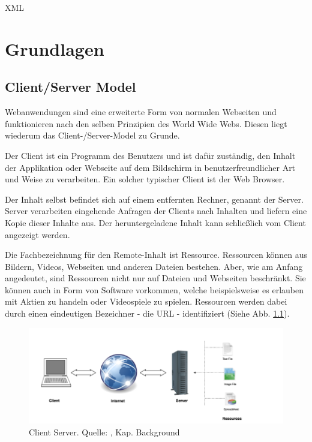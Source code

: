 XML\chapter{Grundlagen}

\section{Client/Server Model}
\label{sec:client_server}

Webanwendungen sind eine erweiterte Form von normalen Webseiten und funktionieren nach den selben Prinzipien des World Wide Webs. Diesen liegt wiederum das Client-/Server-Model zu Grunde.

Der Client ist ein Programm des Benutzers und ist dafür zuständig, den Inhalt der Applikation oder Webseite auf dem Bildschirm in benutzerfreundlicher Art und Weise zu verarbeiten. Ein solcher typischer Client ist der Web Browser.

Der Inhalt selbst befindet sich auf einem entfernten Rechner, genannt der Server. Server verarbeiten eingehende Anfragen der Clients nach Inhalten und liefern eine Kopie dieser Inhalte aus. Der heruntergeladene Inhalt kann schließlich vom Client angezeigt werden.

Die Fachbezeichnung für den Remote-Inhalt ist Ressource. Ressourcen können aus Bildern, Videos, Webseiten und anderen Dateien bestehen. Aber, wie am Anfang angedeutet, sind Ressourcen nicht nur auf Dateien und Webseiten beschränkt. Sie können auch in Form von Software vorkommen, welche beispielsweise es erlauben mit Aktien zu handeln oder Videospiele zu spielen. Ressourcen werden dabei durch einen eindeutigen Bezeichner - die URL - identifiziert (Siehe Abb. \ref{fig:client_server}).

\begin{figure}[htp]     %
\centering
\includegraphics[width=1.0\textwidth]{images/client_server}
\caption{Client Server. Quelle: \cite{Parikh:2015}, Kap. Background}\label{fig:client_server}
\end{figure}

